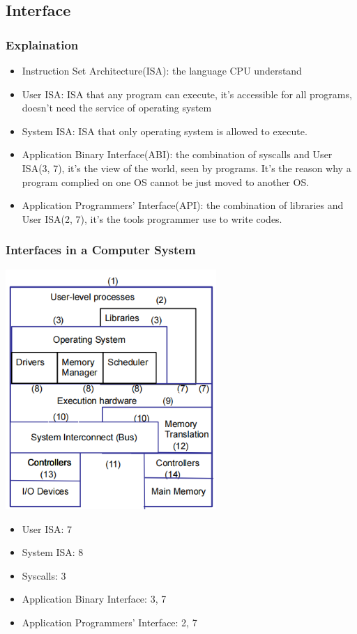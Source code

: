 \documentclass[12pt]{article}
\begin{document}
\subsection{Interface}
\subsubsection{Explaination}
\begin{itemize}
    \item Instruction Set Architecture(ISA): the language CPU understand
    \item User ISA: ISA that any program can execute, it's accessible for all programs, doesn't need the service of operating system
    \item System ISA: ISA that only operating system is allowed to execute.
    \item Application Binary Interface(ABI): the combination of syscalls and User ISA(3, 7), it's the view of the world, seen by programs. It's the reason why a program complied on one OS cannot be just moved to another OS.
    \item Application Programmers' Interface(API): the combination of libraries and User ISA(2, 7), it's the tools programmer use to write codes.
\end{itemize}
\subsubsection{Interfaces in a Computer System}
\includegraphics[width=0.6\textwidth]{InterfacesInComputerSystem.png}
\begin{itemize}
    \item User ISA: 7
    \item System ISA: 8
    \item Syscalls: 3
    \item Application Binary Interface: 3, 7
    \item Application Programmers' Interface: 2, 7
\end{itemize}
\end{document}
